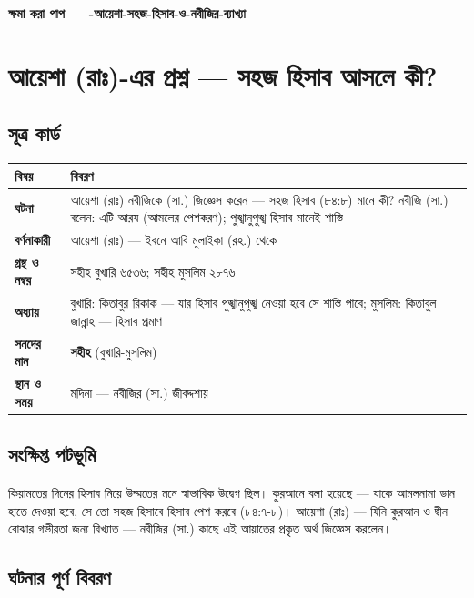 

\begin{center}{\Large\bfseries\color{emerald} ক্ষমা করা পাপ — -আয়েশা-সহজ-হিসাব-ও-নবীজির-ব্যাখ্যা}\end{center}
\vspace{1em}
\section*{আয়েশা (রাঃ)-এর প্রশ্ন — সহজ হিসাব আসলে কী?}

\subsection*{সূত্র কার্ড}

\begin{table}[h]\centering\small
\begin{tabular}{ll}
বিষয় & বিবরণ \\
\hline
\textbf{ঘটনা} & আয়েশা (রাঃ) নবীজিকে (সা.) জিজ্ঞেস করেন — \lat{“}সহজ হিসাব\lat{”} (৮৪:৮) মানে কী? নবীজি (সা.) বলেন: এটি আরয (আমলের পেশকরণ); পুঙ্খানুপুঙ্খ হিসাব মানেই শাস্তি \\
\textbf{বর্ণনাকারী} & আয়েশা (রাঃ) — ইবনে আবি মুলাইকা (রহ.) থেকে \\
\textbf{গ্রন্থ ও নম্বর} & সহীহ বুখারি ৬৫৩৬; সহীহ মুসলিম ২৮৭৬ \\
\textbf{অধ্যায়} & বুখারি: কিতাবুর রিকাক — \lat{“}যার হিসাব পুঙ্খানুপুঙ্খ নেওয়া হবে সে শাস্তি পাবে\lat{”}; মুসলিম: কিতাবুল জান্নাহ — \lat{“}হিসাব প্রমাণ\lat{”} \\
\textbf{সনদের মান} & \textbf{সহীহ} (বুখারি-মুসলিম) \\
\textbf{স্থান ও সময়} & মদিনা — নবীজির (সা.) জীবদ্দশায় \\
\hline
\end{tabular}
\end{table}

\subsection*{সংক্ষিপ্ত পটভূমি}

কিয়ামতের দিনের হিসাব নিয়ে উম্মতের মনে স্বাভাবিক উদ্বেগ ছিল। কুরআনে বলা হয়েছে — যাকে আমলনামা ডান হাতে দেওয়া হবে, সে তো সহজ হিসাবে হিসাব পেশ করবে (৮৪:৭-৮)। আয়েশা (রাঃ) — যিনি কুরআন ও দ্বীন বোঝার গভীরতা জন্য বিখ্যাত — নবীজির (সা.) কাছে এই আয়াতের প্রকৃত অর্থ জিজ্ঞেস করলেন।

\subsection*{ঘটনার পূর্ণ বিবরণ}

